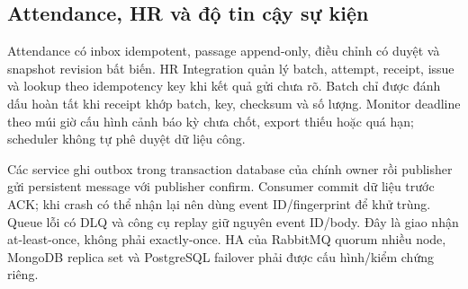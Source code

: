 \subsection{Attendance, HR và độ tin cậy sự kiện}
\label{subsec:attendance-hr}
Attendance có inbox idempotent, passage append-only, điều chỉnh có duyệt và snapshot revision bất biến. HR Integration quản lý batch, attempt, receipt, issue và lookup theo idempotency key khi kết quả gửi chưa rõ. Batch chỉ được đánh dấu hoàn tất khi receipt khớp batch, key, checksum và số lượng. Monitor deadline theo múi giờ cấu hình cảnh báo kỳ chưa chốt, export thiếu hoặc quá hạn; scheduler không tự phê duyệt dữ liệu công.

Các service ghi outbox trong transaction database của chính owner rồi publisher gửi persistent message với publisher confirm. Consumer commit dữ liệu trước ACK; khi crash có thể nhận lại nên dùng event ID/fingerprint để khử trùng. Queue lỗi có DLQ và công cụ replay giữ nguyên event ID/body. Đây là giao nhận at-least-once, không phải exactly-once. HA của RabbitMQ quorum nhiều node, MongoDB replica set và PostgreSQL failover phải được cấu hình/kiểm chứng riêng.

